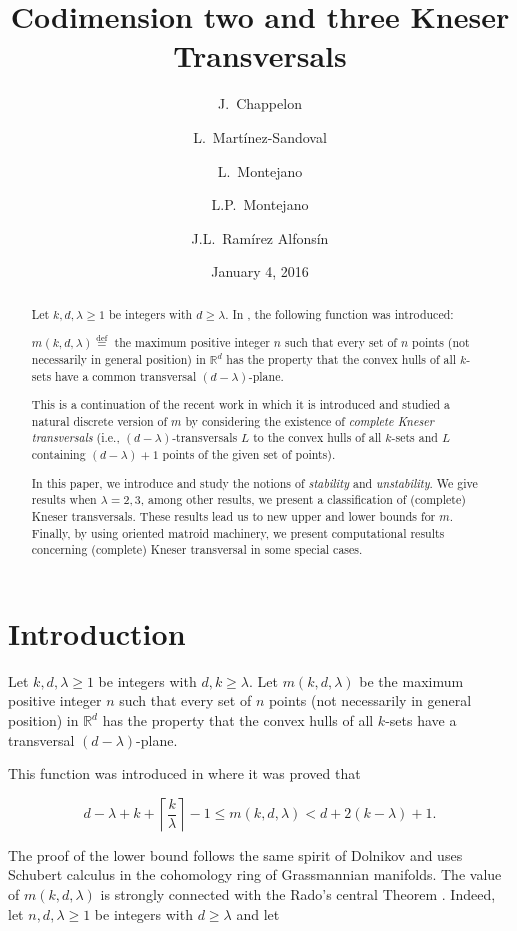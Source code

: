 \documentclass[11pt]{amsart}
\title[Codimension two and three Kneser Transversals]{Codimension two and three Kneser Transversals}
\author[\tiny J.~Chappelon]{J.~Chappelon}
\author[L.~Mart\'{i}nez-Sandoval]{L.~Mart\'{i}nez-Sandoval}
\author[L.~Montejano]{L.~Montejano}
\author[L.P.~Montejano]{L.P.~Montejano}
\author[J.L.~Ram\'{i}rez Alfons\'{i}n]{J.L.~Ram\'{i}rez Alfons\'{i}n}
\date{January 4, 2016}
\theoremstyle{plain}
\theoremstyle{definition}
\theoremstyle{remark}
\begin{document}
\begin{abstract}
Let $k,d,\lambda\geqslant1$ be integers with $d\geqslant\lambda $. In \cite{ABMR}, the following function was introduced:
\par\smallskip
$m(k,d,\lambda)\overset{\mathrm{def}}{=}$ the maximum positive integer $n$ such that every set of $n$ points (not necessarily in general position) in $\mathbb{R}^{d}$ has the property that the convex hulls of all $k$-sets have a common transversal $(d-\lambda)$-plane.
\smallskip\par
This is a continuation of the  recent work \cite{CMMMR} in which it is  introduced and studied  a natural discrete version of $m$ by considering the existence of \emph{complete Kneser transversals} (i.e., $(d-\lambda)$-transversals $L$ to the convex hulls of all $k$-sets and $L$ containing $(d-\lambda)+1$ points of the given set of points).
\smallskip

In this paper, we introduce and study the notions of {\em stability} and {\em unstability}. We give results when $\lambda =2,3$, among other results, we present a classification of (complete) Kneser transversals. These results lead us to new upper and lower bounds for $m$. Finally, by using oriented matroid machinery, we present computational results concerning (complete) Kneser transversal in some special cases. 
\end{abstract}
\maketitle
\section{Introduction}
Let $k,d,\lambda {\geqslant} 1$ be integers with $d, k {\geqslant} \lambda $. Let $m(k,d,\lambda )$ be the maximum positive integer $n$ such that every set of $n$ points (not necessarily in general position) in $\mathbb{R}^{d}$ has the property that the convex hulls of all $k$-sets have a transversal $(d-\lambda )$-plane.
\smallskip

This function was introduced in \cite{ABMR} where it was proved that

\begin{equation}\label{ineq1}
 d-\lambda +k+\left\lceil \frac{k}{\lambda }\right\rceil -1 {\leqslant} m(k,d,\lambda )< d+2(k-\lambda)+1.
\end{equation}
 
The proof of the lower bound follows the same spirit of Dolnikov \cite{D} and uses Schubert calculus in the cohomology ring of Grassmannian manifolds. The value of $m(k,d,\lambda )$ is strongly connected with  the Rado's central Theorem \cite{Rado}.  Indeed, let $n,d,\lambda {\geqslant} 1$ be integers with $d  {\geqslant} \lambda $ and let
\end{document}
